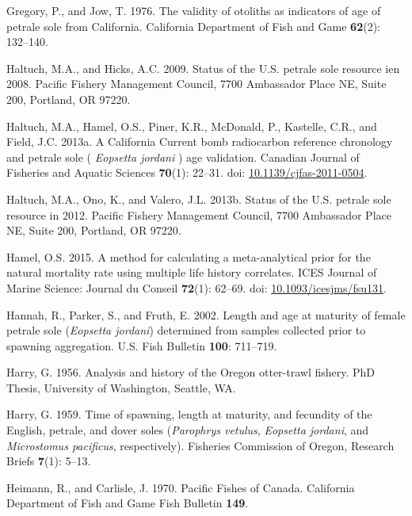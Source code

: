 \documentclass[12pt,]{article}
\begin{document}
\hypertarget{ref-gregory_validity_1976}{}
Gregory, P., and Jow, T. 1976. The validity of otoliths as indicators of
age of petrale sole from California. California Department of Fish and
Game \textbf{62}(2): 132--140.

\hypertarget{ref-haltuch_status_2009}{}
Haltuch, M.A., and Hicks, A.C. 2009. Status of the U.S. petrale sole
resource ien 2008. Pacific Fishery Management Council, 7700 Ambassador
Place NE, Suite 200, Portland, OR 97220.

\hypertarget{ref-haltuch_california_2013}{}
Haltuch, M.A., Hamel, O.S., Piner, K.R., McDonald, P., Kastelle, C.R.,
and Field, J.C. 2013a. A California Current bomb radiocarbon reference
chronology and petrale sole ( \emph{Eopsetta jordani} ) age validation.
Canadian Journal of Fisheries and Aquatic Sciences \textbf{70}(1):
22--31. doi:
\href{https://doi.org/10.1139/cjfas-2011-0504}{10.1139/cjfas-2011-0504}.

\hypertarget{ref-haltuch_status_2013}{}
Haltuch, M.A., Ono, K., and Valero, J.L. 2013b. Status of the U.S.
petrale sole resource in 2012. Pacific Fishery Management Council, 7700
Ambassador Place NE, Suite 200, Portland, OR 97220.

\hypertarget{ref-hamel_method_2015}{}
Hamel, O.S. 2015. A method for calculating a meta-analytical prior for
the natural mortality rate using multiple life history correlates. ICES
Journal of Marine Science: Journal du Conseil \textbf{72}(1): 62--69.
doi:
\href{https://doi.org/10.1093/icesjms/fsu131}{10.1093/icesjms/fsu131}.

\hypertarget{ref-hannah_length_2002}{}
Hannah, R., Parker, S., and Fruth, E. 2002. Length and age at maturity
of female petrale sole (\emph{Eopsetta jordani}) determined from samples
collected prior to spawning aggregation. U.S. Fish Bulletin
\textbf{100}: 711--719.

\hypertarget{ref-harry_analysis_1956}{}
Harry, G. 1956. Analysis and history of the Oregon otter-trawl fishery.
PhD Thesis, University of Washington, Seattle, WA.

\hypertarget{ref-harry_time_1959}{}
Harry, G. 1959. Time of spawning, length at maturity, and fecundity of
the English, petrale, and dover soles (\emph{Parophrys vetulus},
\emph{Eopsetta jordani}, and \emph{Microstomus pacificus},
respectively). Fisheries Commission of Oregon, Research Briefs
\textbf{7}(1): 5--13.

\hypertarget{ref-heimann_pacific_1970}{}
Heimann, R., and Carlisle, J. 1970. Pacific Fishes of Canada. California
Department of Fish and Game Fish Bulletin \textbf{149}.
\end{document}
